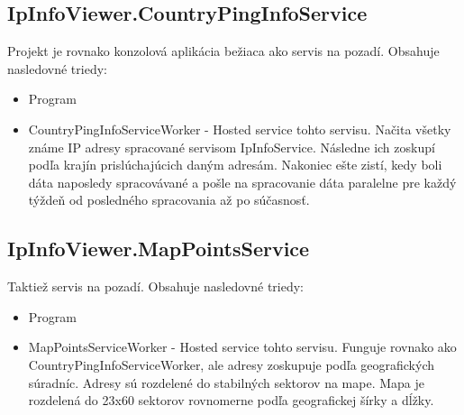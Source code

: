 \subsection{IpInfoViewer.CountryPingInfoService}
Projekt je rovnako konzolová aplikácia bežiaca ako servis na pozadí. Obsahuje nasledovné triedy:
\begin{itemize}
    \item Program
    \item CountryPingInfoServiceWorker
    - Hosted service tohto servisu.
    Načita všetky známe IP adresy spracované servisom IpInfoService. Následne ich zoskupí podľa krajín prislúchajúcich daným adresám. 
    Nakoniec ešte zistí, kedy boli dáta naposledy spracovávané a pošle na spracovanie dáta paralelne pre každý týždeň od posledného spracovania 
    až po súčasnosť.
\end{itemize}
\subsection{IpInfoViewer.MapPointsService}
Taktiež servis na pozadí. Obsahuje nasledovné triedy:
\begin{itemize}
    \item Program
    \item MapPointsServiceWorker
    - Hosted service tohto servisu.
    Funguje rovnako ako CountryPingInfoServiceWorker, ale adresy zoskupuje podľa geografických súradníc. Adresy sú rozdelené do stabilných sektorov 
    na mape. Mapa je rozdelená do 23x60 sektorov rovnomerne podľa geografickej šírky a dĺžky. 
\end{itemize}
